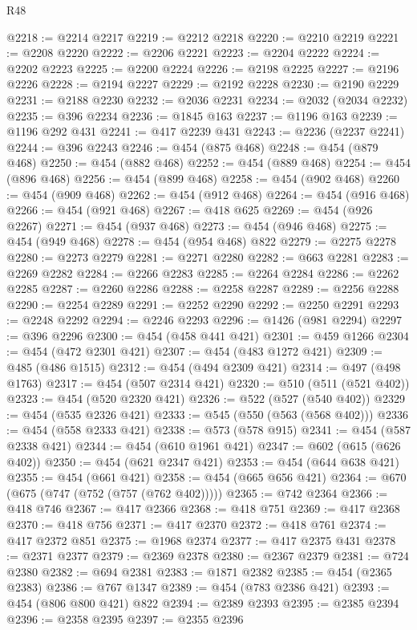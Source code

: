 \begin{lexlean}{R48}
\begin{coremodule}
@2218 := @2214 @2217
@2219 := @2212 @2218
@2220 := @2210 @2219
@2221 := @2208 @2220
@2222 := @2206 @2221
@2223 := @2204 @2222
@2224 := @2202 @2223
@2225 := @2200 @2224
@2226 := @2198 @2225
@2227 := @2196 @2226
@2228 := @2194 @2227
@2229 := @2192 @2228
@2230 := @2190 @2229
@2231 := @2188 @2230
@2232 := @2036 @2231
@2234 := @2032 (@2034 @2232)
@2235 := @396 @2234
@2236 := @1845 @163
@2237 := @1196 @163
@2239 := @1196 @292 @431
@2241 := @417 @2239 @431
@2243 := @2236 (@2237 @2241)
@2244 := @396 @2243
@2246 := @454 (@875 @468)
@2248 := @454 (@879 @468)
@2250 := @454 (@882 @468)
@2252 := @454 (@889 @468)
@2254 := @454 (@896 @468)
@2256 := @454 (@899 @468)
@2258 := @454 (@902 @468)
@2260 := @454 (@909 @468)
@2262 := @454 (@912 @468)
@2264 := @454 (@916 @468)
@2266 := @454 (@921 @468)
@2267 := @418 @625
@2269 := @454 (@926 @2267)
@2271 := @454 (@937 @468)
@2273 := @454 (@946 @468)
@2275 := @454 (@949 @468)
@2278 := @454 (@954 @468) @822
@2279 := @2275 @2278
@2280 := @2273 @2279
@2281 := @2271 @2280
@2282 := @663 @2281
@2283 := @2269 @2282
@2284 := @2266 @2283
@2285 := @2264 @2284
@2286 := @2262 @2285
@2287 := @2260 @2286
@2288 := @2258 @2287
@2289 := @2256 @2288
@2290 := @2254 @2289
@2291 := @2252 @2290
@2292 := @2250 @2291
@2293 := @2248 @2292
@2294 := @2246 @2293
@2296 := @1426 (@981 @2294)
@2297 := @396 @2296
@2300 := @454 (@458 @441 @421)
@2301 := @459 @1266
@2304 := @454 (@472 @2301 @421)
@2307 := @454 (@483 @1272 @421)
@2309 := @485 (@486 @1515)
@2312 := @454 (@494 @2309 @421)
@2314 := @497 (@498 @1763)
@2317 := @454 (@507 @2314 @421)
@2320 := @510 (@511 (@521 @402))
@2323 := @454 (@520 @2320 @421)
@2326 := @522 (@527 (@540 @402))
@2329 := @454 (@535 @2326 @421)
@2333 := @545 (@550 (@563 (@568 @402)))
@2336 := @454 (@558 @2333 @421)
@2338 := @573 (@578 @915)
@2341 := @454 (@587 @2338 @421)
@2344 := @454 (@610 @1961 @421)
@2347 := @602 (@615 (@626 @402))
@2350 := @454 (@621 @2347 @421)
@2353 := @454 (@644 @638 @421)
@2355 := @454 (@661 @421)
@2358 := @454 (@665 @656 @421)
@2364 := @670 (@675 (@747 (@752 (@757 (@762 @402)))))
@2365 := @742 @2364
@2366 := @418 @746
@2367 := @417 @2366
@2368 := @418 @751
@2369 := @417 @2368
@2370 := @418 @756
@2371 := @417 @2370
@2372 := @418 @761
@2374 := @417 @2372 @851
@2375 := @1968 @2374
@2377 := @417 @2375 @431
@2378 := @2371 @2377
@2379 := @2369 @2378
@2380 := @2367 @2379
@2381 := @724 @2380
@2382 := @694 @2381
@2383 := @1871 @2382
@2385 := @454 (@2365 @2383)
@2386 := @767 @1347
@2389 := @454 (@783 @2386 @421)
@2393 := @454 (@806 @800 @421) @822
@2394 := @2389 @2393
@2395 := @2385 @2394
@2396 := @2358 @2395
@2397 := @2355 @2396

\end{coremodule}
\end{lexlean}
